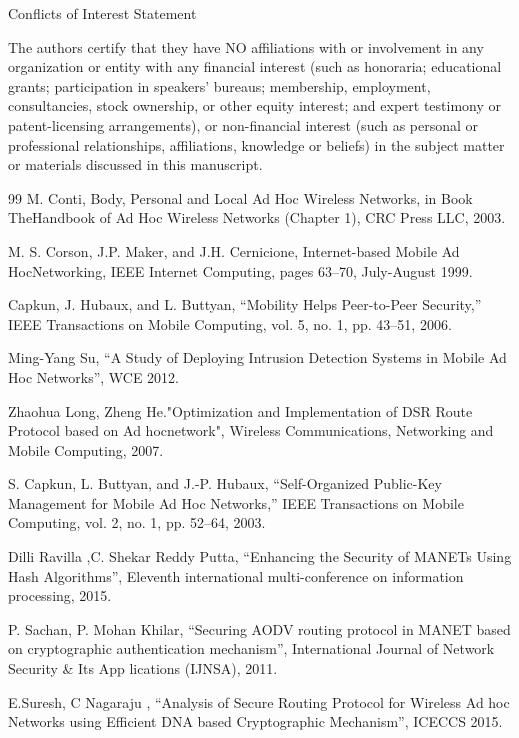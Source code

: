 \documentclass[10pt]{NSP1}
\begin{document}
Conflicts of Interest Statement

The authors certify that they have NO affiliations with or involvement in any organization or entity with any financial interest (such as honoraria; educational grants; participation in speakers’ bureaus; membership, employment, consultancies, stock ownership, or other equity interest; and expert testimony or patent-licensing arrangements), or non-financial interest (such as personal or professional relationships, affiliations, knowledge or beliefs) in the subject matter or materials discussed in this manuscript.

\begin{thebibliography}{99}
M. Conti, Body, Personal and Local Ad Hoc Wireless Networks, in Book TheHandbook of Ad Hoc Wireless Networks (Chapter 1), CRC Press LLC, 2003.

M. S. Corson, J.P. Maker, and J.H. Cernicione, Internet-based Mobile Ad HocNetworking, IEEE Internet Computing, pages 63–70, July-August 1999.

Capkun, J. Hubaux, and L. Buttyan, “Mobility Helps Peer-to-Peer Security,” IEEE Transactions on Mobile Computing, vol. 5, no. 1, pp. 43–51, 2006.

Ming-Yang Su, “A Study of Deploying Intrusion Detection Systems in Mobile Ad Hoc Networks”, WCE 2012.

Zhaohua Long, Zheng He."Optimization and Implementation of DSR Route Protocol based on Ad hocnetwork", Wireless Communications, Networking and Mobile Computing, 2007.

S. Capkun, L. Buttyan, and J.-P. Hubaux, “Self-Organized Public-Key Management for Mobile Ad Hoc Networks,” IEEE Transactions on Mobile Computing, vol. 2, no. 1, pp. 52–64, 2003.

Dilli Ravilla ,C. Shekar Reddy Putta, “Enhancing the Security of MANETs Using Hash Algorithms”, Eleventh international multi-conference on information processing, 2015.

P. Sachan, P. Mohan Khilar, “Securing AODV routing protocol in MANET based on cryptographic authentication mechanism”, International Journal of Network Security \& Its App lications (IJNSA), 2011.

E.Suresh, C Nagaraju , “Analysis of Secure Routing Protocol for Wireless Ad hoc Networks using Efficient DNA based Cryptographic Mechanism”, ICECCS 2015.


\end{thebibliography}
\end{document}
